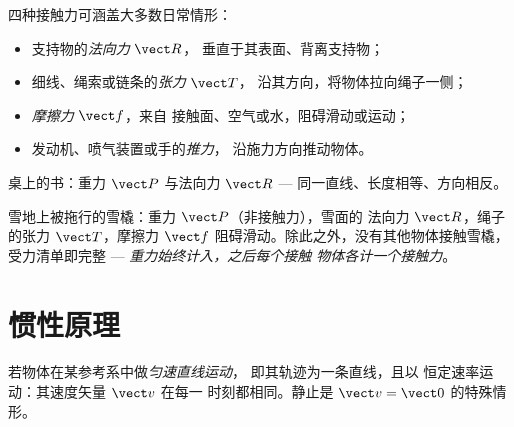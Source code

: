 \begin{definition}[常见的接触力]\label{def:g10:inertia:inventory}
四种接触力可涵盖大多数日常情形：
\begin{itemize}
  \item 支持物的\emph{法向力} $\vect R$，
        垂直于其表面、背离支持物；
  \item 细线、绳索或链条的\emph{张力} $\vect T$，
        沿其方向，将物体拉向绳子一侧；
  \item \emph{摩擦力} $\vect f$，来自
        接触面、空气或水，阻碍滑动或运动；
  \item 发动机、喷气装置或手的\emph{推力}，
        沿施力方向推动物体。
\end{itemize}
\end{definition}

\begin{omfigure}

{\small 桌上的书：重力 $\vect P$ 与法向力
$\vect R$ --- 同一直线、长度相等、方向相反。}
\end{omfigure}

\begin{example}[被拖雪橇的受力清单]\label{ex:g10:inertia:sled}
雪地上被拖行的雪橇：重力 $\vect P$（非接触力），雪面的
法向力 $\vect R$，绳子的张力 $\vect T$，摩擦力
$\vect f$ 阻碍滑动。除此之外，没有其他物体接触雪橇，
受力清单即完整 --- \emph{重力始终计入，之后每个接触
物体各计一个接触力}。
\end{example}

\section{惯性原理}

\begin{definition}[匀速直线运动]\label{def:g10:inertia:uniform}
若物体在某参考系中做\emph{匀速直线运动}，
即其轨迹为一条直线，且以
恒定速率运动：其速度矢量 $\vect v$ 在每一
时刻都相同。静止是 $\vect v = \vect 0$ 的特殊情形。
\end{definition}

